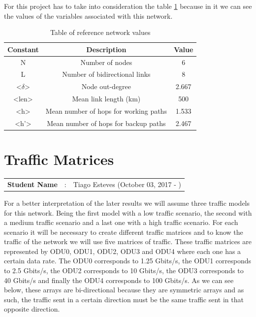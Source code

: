 \newpage
For this project has to take into consideration the table \ref{table_ref_net} because in it we can see the values of the variables associated with this network.\\

\begin{table}[h!]
\centering
\begin{tabular}{|| c | c | c||}
 \hline
 Constant & Description & Value \\
 \hline\hline
 N & Number of nodes & 6 \\
 L & Number of bidirectional links & 8 \\
 <$\delta$> & Node out-degree & 2.667 \\
 <len> & Mean link length (km) & 500 \\
 <h> & Mean number of hops for working paths & 1.533 \\
 <h'> & Mean number of hops for backup paths & 2.467 \\
 \hline
\end{tabular}
\caption{Table of reference network values}
\label{table_ref_net}
\end{table}


\section{Traffic Matrices}\label{Reference_Network_Traffic}
\begin{tcolorbox}	
\begin{tabular}{p{2.75cm} p{0.2cm} p{10.5cm}} 	
\textbf{Student Name}  &:& Tiago Esteves    (October 03, 2017 - )\\
\end{tabular}
\end{tcolorbox}
\vspace{11pt}

For a better interpretation of the later results we will assume three traffic models for this network.
Being the first model with a low traffic scenario, the second with a medium traffic scenario and a last one with a high traffic scenario.
For each scenario it will be necessary to create different traffic matrices and to know the traffic of the network we will use five matrices of traffic.
These traffic matrices are represented by ODU0, ODU1, ODU2, ODU3 and ODU4 where each one has a certain data rate.
The ODU0 corresponds to 1.25 Gbits/s, the ODU1 corresponds to 2.5 Gbits/s, the ODU2 corresponds to 10 Gbits/s, the ODU3 corresponds to 40 Gbits/s and finally the ODU4 corresponds to 100 Gbits/s.
As we can see below, these arrays are bi-directional because they are symmetric arrays and as such, the traffic sent in a certain direction must be the same traffic sent in that opposite direction.

